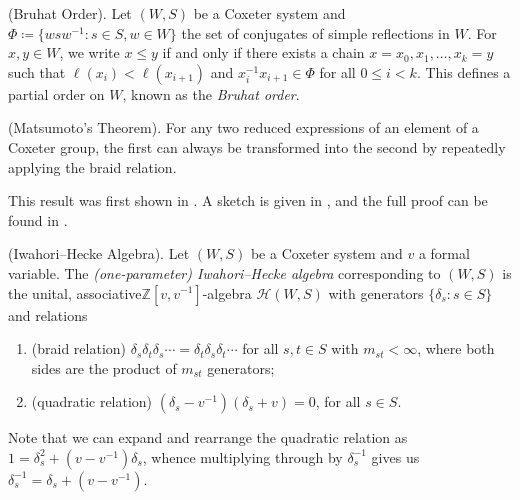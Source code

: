 \noindent\begin{definition}\textup{(Bruhat Order).} Let $(W, S)$ be a Coxeter system and $\Phi \coloneqq \{wsw^{-1} : s \in S, w \in W\}$ the set of conjugates of simple reflections in $W$. For $x, y \in W$, we write $x \leq y$ if and only if there exists a chain $x = x_0, x_1, \dots, x_k = y$ such that $\ell(x_i) < \ell(x_{i+1})$ and $x_i^{-1}x_{i+1} \in \Phi$ for all $0 \leq i < k$. This defines a partial order on $W$, known as the {\em Bruhat order}.\\
\end{definition}

\noindent\begin{theorem}\label{Matsumoto}\textup{(Matsumoto's Theorem).} For any two reduced expressions of an element of a Coxeter group, the first can always be transformed into the second by repeatedly applying the braid relation.\\
\end{theorem}

\noindent This result was first shown in \cite{Mat64}. A sketch is given in \cite[Theorem 2.20]{EMTW20}, and the full proof can be found in \cite[Theorem 1.2.2]{GP00}.\newpage

\noindent\begin{definition}\textup{(Iwahori--Hecke Algebra).} Let $(W, S)$ be a Coxeter system and $v$ a formal variable. The {\em (one-parameter) Iwahori--Hecke algebra} corresponding to $(W, S)$ is the unital, associative\linebreak $\mathbb{Z}[v, v^{-1}]$-algebra $\mathscr{H}(W, S)$ with generators $\{\delta_s : s \in S\}$ and relations
\begin{enumerate}[label=$\bullet$, leftmargin=4\parindent]
\item (braid relation) $\delta_s\delta_t\delta_s\cdots = \delta_t\delta_s\delta_t\cdots$ for all $s, t \in S$ with $m_{st} < \infty$, where both sides are the product of $m_{st}$ generators;
\item (quadratic relation) $(\delta_s - v^{-1})(\delta_s + v) = 0$, for all $s \in S$.\\
\end{enumerate}
\end{definition}

\noindent Note that we can expand and rearrange the quadratic relation as $1 = \delta_s^2 + (v - v^{-1})\delta_s$, whence multiplying through by $\delta_s^{-1}$ gives us $\delta_s^{-1} = \delta_s + (v - v^{-1})$.\\

